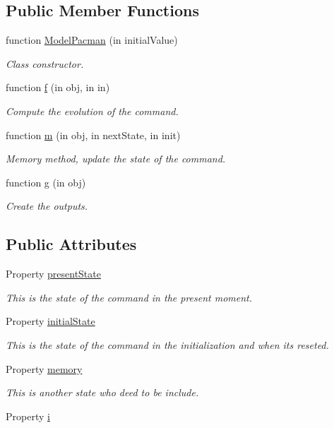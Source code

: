 \subsection*{Public Member Functions}
\begin{DoxyCompactItemize}
\item 
function \hyperlink{class_model_pacman_aeece945de8fe29ca408290f87392ac3d}{Model\+Pacman} (in initial\+Value)
\begin{DoxyCompactList}\small\item\em Class constructor. \end{DoxyCompactList}\item 
function \hyperlink{class_model_pacman_a6f3b146c92a207e95690d08975e1e072}{f} (in obj, in in)
\begin{DoxyCompactList}\small\item\em Compute the evolution of the command. \end{DoxyCompactList}\item 
function \hyperlink{class_model_pacman_a3140f24c6c4b80037b7d4f521c6ae2d3}{m} (in obj, in next\+State, in init)
\begin{DoxyCompactList}\small\item\em Memory method, update the state of the command. \end{DoxyCompactList}\item 
function \hyperlink{class_model_pacman_a07dadfabe92bf9a144b8a862720e7746}{g} (in obj)
\begin{DoxyCompactList}\small\item\em Create the outputs. \end{DoxyCompactList}\end{DoxyCompactItemize}
\subsection*{Public Attributes}
\begin{DoxyCompactItemize}
\item 
Property \hyperlink{class_model_pacman_a9624cc7c421a50fa5086b0ebd0cd5fe3}{present\+State}
\begin{DoxyCompactList}\small\item\em This is the state of the command in the present moment. \end{DoxyCompactList}\item 
Property \hyperlink{class_model_pacman_acd9263acfa96c9138afdf497e55acc24}{initial\+State}
\begin{DoxyCompactList}\small\item\em This is the state of the command in the initialization and when it\textquotesingle{}s reseted. \end{DoxyCompactList}\item 
Property \hyperlink{class_model_pacman_a9a61c54203464d470acd8580a6464f8e}{memory}
\begin{DoxyCompactList}\small\item\em This is another state who deed to be include. \end{DoxyCompactList}\item 
Property \hyperlink{class_model_pacman_a103c618d75e54c3a72fac6bcaa59f61f}{i}
\end{DoxyCompactItemize}


